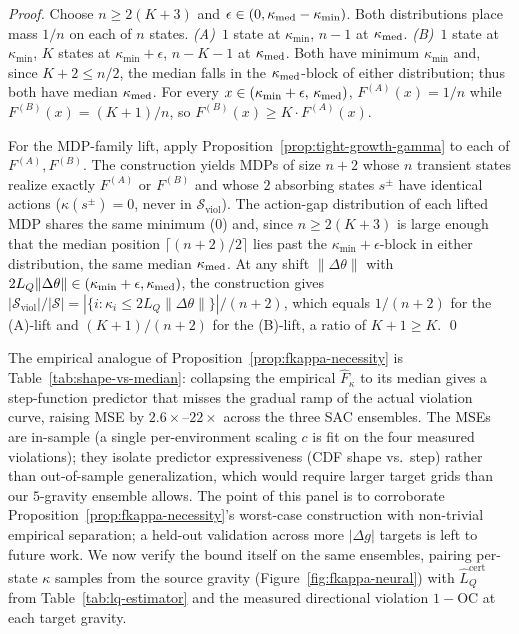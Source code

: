 \documentclass{article}
\newcommand{\cS}{\mathcal{S}}
\newcommand{\Sviol}{\mathcal{S}_{\mathrm{viol}}}
\begin{document}
\begin{proof}
Choose $n \geq 2(K+3)$ and $\epsilon \in (0, \kappa_{\rm med} - \kappa_{\min})$. Both distributions place mass $1/n$ on each of $n$ states.
\emph{(A)}\, $1$ state at $\kappa_{\min}$, $n-1$ at $\kappa_{\rm med}$.
\emph{(B)}\, $1$ state at $\kappa_{\min}$, $K$ states at $\kappa_{\min}+\epsilon$, $n-K-1$ at $\kappa_{\rm med}$.
Both have minimum $\kappa_{\min}$ and, since $K+2 \leq n/2$, the median falls in the $\kappa_{\rm med}$-block of either distribution; thus both have median $\kappa_{\rm med}$. For every $x \in (\kappa_{\min}+\epsilon,\, \kappa_{\rm med})$, $F^{(A)}(x) = 1/n$ while $F^{(B)}(x) = (K+1)/n$, so $F^{(B)}(x) \geq K \cdot F^{(A)}(x)$.

For the MDP-family lift, apply Proposition~\ref{prop:tight-growth-gamma} to each of $F^{(A)}, F^{(B)}$. The construction yields MDPs of size $n+2$ whose $n$ transient states realize exactly $F^{(A)}$ or $F^{(B)}$ and whose $2$ absorbing states $s^\pm$ have identical actions ($\kappa(s^\pm) = 0$, never in $\Sviol$). The action-gap distribution of each lifted MDP shares the same minimum ($0$) and, since $n \geq 2(K+3)$ is large enough that the median position $\lceil (n+2)/2\rceil$ lies past the $\kappa_{\min}+\epsilon$-block in either distribution, the same median $\kappa_{\rm med}$. At any shift $\|\Delta\theta\|$ with $2L_Q\|\Delta\theta\| \in (\kappa_{\min}+\epsilon, \kappa_{\rm med})$, the construction gives $|\Sviol|/|\cS| = |\{i:\kappa_i \leq 2L_Q\|\Delta\theta\|\}|/(n+2)$, which equals $1/(n+2)$ for the (A)-lift and $(K+1)/(n+2)$ for the (B)-lift, a ratio of $K+1 \geq K$. \qed
\end{proof}

The empirical analogue of Proposition~\ref{prop:fkappa-necessity} is Table~\ref{tab:shape-vs-median}: collapsing the empirical $\hat F_\kappa$ to its median gives a step-function predictor that misses the gradual ramp of the actual violation curve, raising MSE by $2.6\times$--$22\times$ across the three SAC ensembles. The MSEs are in-sample (a single per-environment scaling $c$ is fit on the four measured violations); they isolate predictor expressiveness (CDF shape vs.\ step) rather than out-of-sample generalization, which would require larger target grids than our $5$-gravity ensemble allows. The point of this panel is to corroborate Proposition~\ref{prop:fkappa-necessity}'s worst-case construction with non-trivial empirical separation; a held-out validation across more $|\Delta g|$ targets is left to future work. We now verify the bound itself on the same ensembles, pairing per-state $\kappa$ samples from the source gravity (Figure~\ref{fig:fkappa-neural}) with $\hat L_Q^{\mathrm{cert}}$ from Table~\ref{tab:lq-estimator} and the measured directional violation $1-\mathrm{OC}$ at each target gravity.
\end{document}
